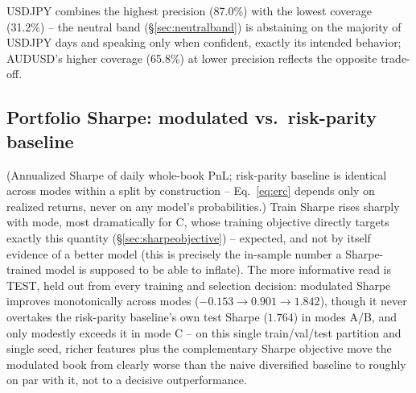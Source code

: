 \documentclass[11pt]{article}
\begin{document}
USDJPY combines the highest precision (87.0\%) with the lowest coverage (31.2\%) -- the
neutral band (\S\ref{sec:neutralband}) is abstaining on the majority of USDJPY days and
speaking only when confident, exactly its intended behavior; AUDUSD's higher coverage
(65.8\%) at lower precision reflects the opposite trade-off.

\subsection{Portfolio Sharpe: modulated vs.\ risk-parity baseline}

\begin{center}
\renewcommand{\arraystretch}{1.2}
\end{center}

(Annualized Sharpe of daily whole-book PnL; risk-parity baseline is identical across modes
within a split by construction -- Eq.~\ref{eq:erc} depends only on realized returns, never
on any model's probabilities.) Train Sharpe rises sharply with mode, most dramatically for
C, whose training objective directly targets exactly this quantity (\S\ref{sec:sharpeobjective}) --
expected, and not by itself evidence of a better model (this is precisely the in-sample
number a Sharpe-trained model is supposed to be able to inflate). The more informative read
is TEST, held out from every training and selection decision: modulated Sharpe improves
monotonically across modes ($-0.153 \to 0.901 \to 1.842$), though it never overtakes the
risk-parity baseline's own test Sharpe ($1.764$) in modes A/B, and only modestly exceeds it
in mode C -- on this single train/val/test partition and single seed, richer features plus
the complementary Sharpe objective move the modulated book from clearly worse than the naive
diversified baseline to roughly on par with it, not to a decisive outperformance.
\end{document}
